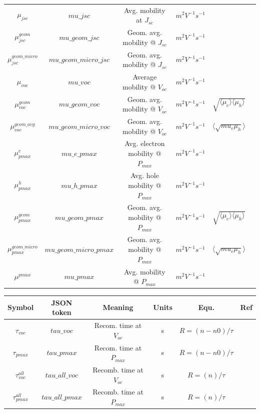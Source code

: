 \begin{landscape}
\begin{center}
\begin{tabular}{ |c|c|c|c| c| c|}
$\mu_{jsc}$ 				& $mu\_{jsc}$ 				& Avg. mobility at $J_{sc}$				&$m^{2} V^{-1} s^{-1}$ 	&&\\
$\mu^{geom}_{jsc}$ 			& $mu\_geom\_jsc$ 			& Geom. avg. mobility @ $J_{sc}$		&$m^{2} V^{-1} s^{-1}$ 	&&\\
$\mu^{geom\_micro}_{jsc}$ 	& $mu\_geom\_micro\_jsc$ 	& Geom. avg. mobility @ $J_{sc}$		&$m^{2} V^{-1} s^{-1}$ 	&&\\


$\mu_{voc}$ 				& $mu\_{voc}$ 				& Average mobility @ $V_{oc}$			& $m^{2} V^{-1} s^{-1}$ &&\\
$\mu^{geom}_{voc}$ 			& $mu\_geom\_voc$ 			& Geom. avg. mobility @ $V_{oc}$		& $m^{2} V^{-1} s^{-1}$ &$\sqrt{\langle\mu_e\rangle \langle\mu_h\rangle}$&\\
$\mu^{geom\_avg}_{voc}$ 	& $mu\_geom\_micro\_voc$ 	& Geom. avg. mobility @ $V_{oc}$		& $m^{2} V^{-1} s^{-1}$ &$\langle\sqrt{mu_e \mu_h}\rangle$&\\

$\mu^e_{pmax}$ 				& $mu\_e\_{pmax}$ 			& Avg. electron mobility @ $P_{max}$	&$m^{2} V^{-1} s^{-1}$ 	&&\\
$\mu^h_{pmax}$ 				& $mu\_h\_{pmax}$ 			& Avg. hole mobility @ $P_{max}$ 		&$m^{2} V^{-1} s^{-1}$ 	&&\\
$\mu^{geom}_{pmax}$ 		& $mu\_geom\_pmax$ 			& Geom. avg. mobility @ $P_{max}$ 		&$m^{2} V^{-1} s^{-1}$ 	&$\sqrt{\langle\mu_e\rangle \langle\mu_h\rangle}$&\\
$\mu^{geom\_micro}_{pmax}$ 	& $mu\_geom\_micro\_pmax$ 	& Geom. avg. mobility @ $P_{max}$ 		&$m^{2} V^{-1} s^{-1}$ 	&$\langle\sqrt{mu_e \mu_h}\rangle$&\\
$\mu^{pmax}$ 				& $mu\_{pmax}$ 				& Avg. mobility @ $P_{max}$				&$m^{2} V^{-1} s^{-1}$ 	&&\\
\hline
\end{tabular}

\end{center}

\begin{center}
\begin{tabular}{ |c|c|c|c| c| c|} 
\hline
Symbol & JSON token & Meaning & Units & Equ. & Ref \\
\hline


$\tau_{voc}$ 	& $tau\_{voc}$ 	&	Recom. time at $V_{oc}$	 			& s 		&	$R=(n-n0)/\tau$  & \cite{doi:10.1021/jp073056p}\\
$\tau_{pmax}$ 	& $tau\_{pmax}$ &	Recom. time at $P_{max}$				&s 			&	$R=(n-n0)/\tau$  & \cite{doi:10.1021/jp073056p}\\
$\tau_{voc}^{all}$ 	& $tau\_all\_{voc}$ 	&	Recomb. time at $V_{oc}$	& s 		&	$R=(n)/\tau$  & \cite{doi:10.1021/jp073056p}\\
$\tau_{pmax}^{all}$ 	& $tau\_all\_{pmax}$ &	Recomb. time at $P_{max}$	&s 			&	$R=(n)/\tau$  & \cite{doi:10.1021/jp073056p}\\
\hline


\end{tabular}
\end{center}
\end{landscape}
